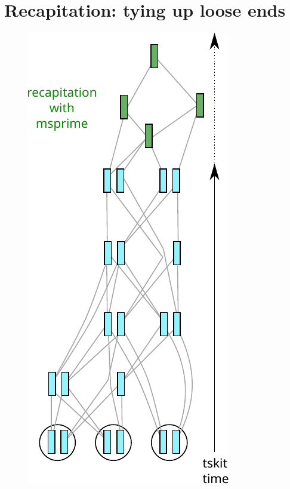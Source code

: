\documentclass[12pt]{article}
\begin{document}
\section{Recapitation: tying up loose ends} %

\begin{figure}
\centering
    \includegraphics{figures/pedigree_recapitate}

\end{figure}
\end{document}
